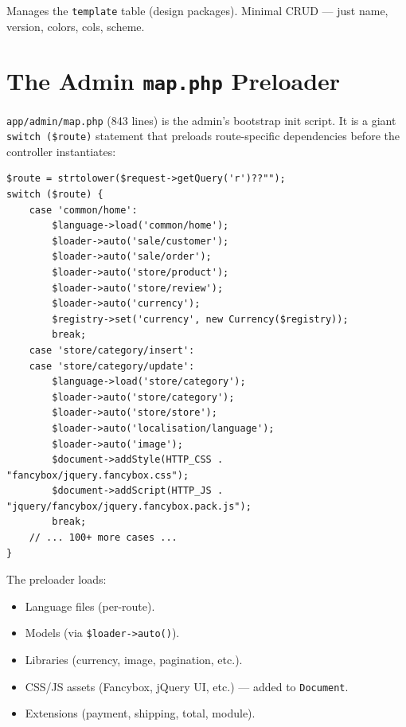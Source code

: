 \documentclass[11pt,a4paper]{article}
\begin{document}
Manages the \texttt{template} table (design packages). Minimal CRUD ---
just name, version, colors, cols, scheme.

\section{The Admin \texttt{map.php} Preloader}\label{sec:admin-map}

\texttt{app/admin/map.php} (843 lines) is the admin's bootstrap init
script. It is a giant \texttt{switch (\$route)} statement that preloads
route-specific dependencies before the controller instantiates:

\begin{lstlisting}[caption={\texttt{app/admin/map.php} --- the route-aware preloader (abridged).},label={lst:admin-map}]
$route = strtolower($request->getQuery('r')??"");
switch ($route) {
    case 'common/home':
        $language->load('common/home');
        $loader->auto('sale/customer');
        $loader->auto('sale/order');
        $loader->auto('store/product');
        $loader->auto('store/review');
        $loader->auto('currency');
        $registry->set('currency', new Currency($registry));
        break;
    case 'store/category/insert':
    case 'store/category/update':
        $language->load('store/category');
        $loader->auto('store/category');
        $loader->auto('store/store');
        $loader->auto('localisation/language');
        $loader->auto('image');
        $document->addStyle(HTTP_CSS . "fancybox/jquery.fancybox.css");
        $document->addScript(HTTP_JS . "jquery/fancybox/jquery.fancybox.pack.js");
        break;
    // ... 100+ more cases ...
}
\end{lstlisting}

The preloader loads:
\begin{itemize}[leftmargin=1.6em,itemsep=2pt]
  \item Language files (per-route).
  \item Models (via \texttt{\$loader->auto()}).
  \item Libraries (currency, image, pagination, etc.).
  \item CSS/JS assets (Fancybox, jQuery UI, etc.) --- added to
        \texttt{Document}.
  \item Extensions (payment, shipping, total, module).
\end{itemize}
\end{document}

